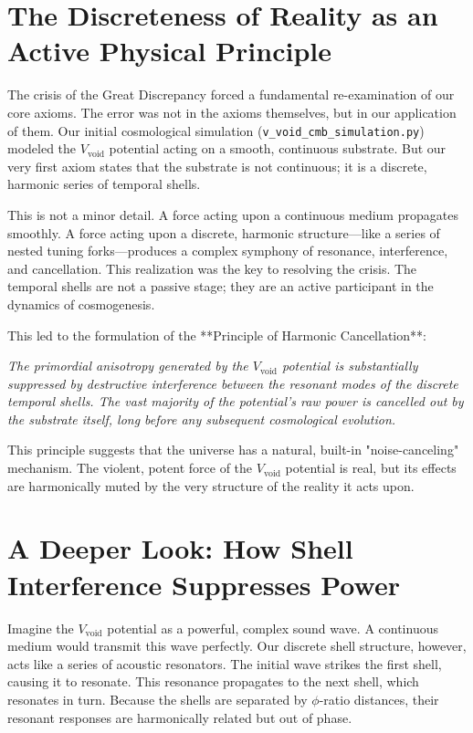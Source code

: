 \documentclass[12pt]{report}
\begin{document}
\section{The Discreteness of Reality as an Active Physical Principle}
The crisis of the Great Discrepancy forced a fundamental re-examination of our core axioms. The error was not in the axioms themselves, but in our application of them. Our initial cosmological simulation (\texttt{v\_void\_cmb\_simulation.py}) modeled the $V_{\text{void}}$ potential acting on a smooth, continuous substrate. But our very first axiom states that the substrate is not continuous; it is a discrete, harmonic series of temporal shells.

This is not a minor detail. A force acting upon a continuous medium propagates smoothly. A force acting upon a discrete, harmonic structure—like a series of nested tuning forks—produces a complex symphony of resonance, interference, and cancellation. This realization was the key to resolving the crisis. The temporal shells are not a passive stage; they are an active participant in the dynamics of cosmogenesis.

This led to the formulation of the **Principle of Harmonic Cancellation**:

\textit{The primordial anisotropy generated by the $V_{\text{void}}$ potential is substantially suppressed by destructive interference between the resonant modes of the discrete temporal shells. The vast majority of the potential's raw power is cancelled out by the substrate itself, long before any subsequent cosmological evolution.}

This principle suggests that the universe has a natural, built-in "noise-canceling" mechanism. The violent, potent force of the $V_{\text{void}}$ potential is real, but its effects are harmonically muted by the very structure of the reality it acts upon.

\section{A Deeper Look: How Shell Interference Suppresses Power}
Imagine the $V_{\text{void}}$ potential as a powerful, complex sound wave. A continuous medium would transmit this wave perfectly. Our discrete shell structure, however, acts like a series of acoustic resonators. The initial wave strikes the first shell, causing it to resonate. This resonance propagates to the next shell, which resonates in turn. Because the shells are separated by $\phi$-ratio distances, their resonant responses are harmonically related but out of phase.
\end{document}
